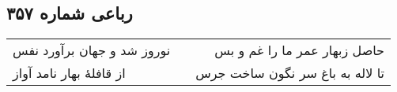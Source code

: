 \begin{center}
\section*{رباعی شماره ۳۵۷}
\label{sec:sh357}
\begin{longtable}{l p{0.5cm} r}
نوروز شد و جهان برآورد نفس
&&
حاصل زبهار عمر ما را غم و بس
\\
از قافلهٔ بهار نامد آواز
&&
تا لاله به باغ سر نگون ساخت جرس
\\
\end{longtable}
\end{center}
